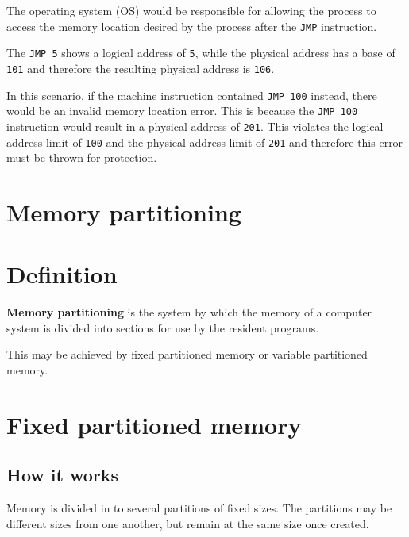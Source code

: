 \documentclass[a4paper]{systems-software}
\begin{document}
The operating system (OS) would be responsible for allowing the process to access the memory location desired by the process after the \texttt{JMP} instruction.

The \texttt{JMP 5} shows a logical address of \texttt{5}, while the physical address has a base of \texttt{101} and therefore the resulting physical address is \texttt{106}.

In this scenario, if the machine instruction contained \texttt{JMP 100} instead, there would be an invalid memory location error. This is because the \texttt{JMP 100} instruction would result in a physical address of \texttt{201}. This violates the logical address limit of \texttt{100} and the physical address limit of \texttt{201} and therefore this error must be thrown for protection.



\section{Memory partitioning}

\section*{Definition}

\textbf{Memory partitioning} is the system by which the memory of a computer system is divided into sections for use by the resident programs.

This may be achieved by fixed partitioned memory or variable partitioned memory.


\section*{Fixed partitioned memory}

\subsection*{How it works}

Memory is divided in to several partitions of fixed sizes. The partitions may be different sizes from one another, but remain at the same size once created.
\end{document}
